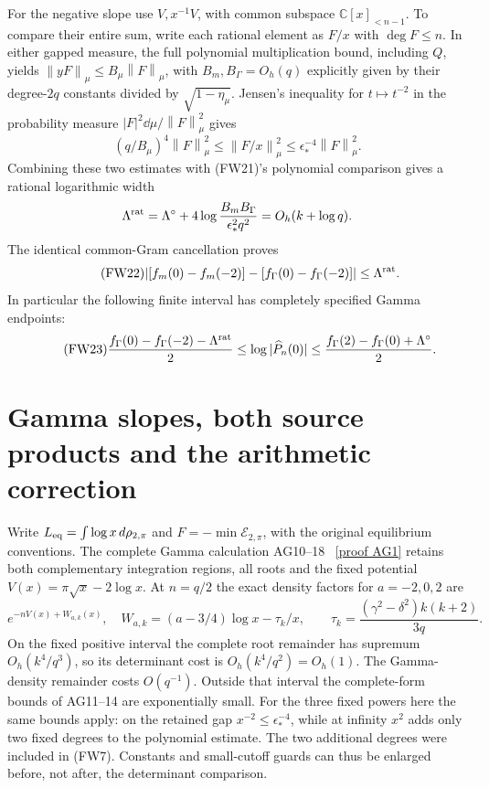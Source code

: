 \documentclass[11pt]{article}
\newcommand{\C}{\mathbb C}\newcommand{\R}{\mathbb R}
\newcommand{\norm}[1]{\left\lVert#1\right\rVert}
\begin{document}
For the negative slope use $V,x^{-1}V$, with common subspace
$\C[x]_{<n-1}$. To compare their entire sum, write each rational
element as $F/x$ with $\deg F\le n$. In either gapped measure,
the full polynomial multiplication bound, including $Q$, yields
$\norm{yF}_\mu\le B_\mu\norm F_\mu$, with
$B_m,B_\Gamma=O_h(q)$ explicitly given by their degree-$2q$ constants
divided by $\sqrt{1-\eta_\mu}$.
Jensen's inequality for $t\mapsto t^{-2}$ in the probability measure
$|F|^2\dd\mu/\norm F_\mu^2$ gives
\[
 (q/B_\mu)^4\norm F_\mu^2\le\norm{F/x}_\mu^2
 \le\epsilon_*^{-4}\norm F_\mu^2.
\]
Combining these two estimates with (FW21)'s polynomial comparison
gives a rational logarithmic width
\[
 \Lambda^{\rm rat}=\Lambda^\circ+
     4\log\frac{B_mB_\Gamma}{\epsilon_*^2q^2}=O_h(k+\log q).
\]
The identical common-Gram cancellation proves
\begin{equation}\tag{FW22}
 |[f_m(0)-f_m(-2)]-[f_\Gamma(0)-f_\Gamma(-2)]|
 \le\Lambda^{\rm rat}.
\end{equation}
In particular the following finite interval has completely specified
Gamma endpoints:
\begin{equation}\tag{FW23}
 \frac{f_\Gamma(0)-f_\Gamma(-2)-\Lambda^{\rm rat}}2
 \le\log|\widehat P_n(0)|\le
 \frac{f_\Gamma(2)-f_\Gamma(0)+\Lambda^\circ}2.
\end{equation}

\section{Gamma slopes, both source products and the arithmetic correction}
Write $L_{\rm eq}=\int\log x\,d\rho_{2,\pi}$ and
$F=-\min\mathcal E_{2,\pi}$, with the original equilibrium conventions.
The complete Gamma calculation AG10--18 \cite{ag}%
~\href{https://github.com/KokunoYumeto/zeta-function-research-reader/blob/5992ad50c0f2a06921f1fcaded7b4e38097c0739/workbenches/splitzero-tandem/continuations/20260920-original-kernel-mixed-determinants/providers/ABSOLUTE_GAMMA_AND_ACTION.tex\#L29}{[proof AG1]}%
{} retains both
complementary integration regions, all roots and the fixed potential
$V(x)=\pi\sqrt x-2\log x$. At $n=q/2$ the exact density factors for
$a=-2,0,2$ are
\begin{equation}\tag{FW24}
 e^{-nV(x)+W_{a,k}(x)},\quad
 W_{a,k}=(a-3/4)\log x-\tau_k/x,\qquad
 \tau_k=\frac{(\gamma^2-\delta^2)k(k+2)}{3q}.
\end{equation}
On the fixed positive interval the complete root remainder has
supremum $O_h(k^4/q^3)$, so its determinant cost is $O_h(k^4/q^2)=O_h(1)$.
The Gamma-density remainder costs $O(q^{-1})$. Outside that interval
the complete-form bounds of AG11--14 are exponentially small.
For the three fixed powers here the same bounds apply: on the retained
gap $x^{-2}\le\epsilon_*^{-4}$, while at infinity $x^2$ adds only two
fixed degrees to the polynomial estimate. The two additional degrees
were included in (FW7). Constants and small-cutoff guards can thus be
enlarged before, not after, the determinant comparison.
\end{document}
